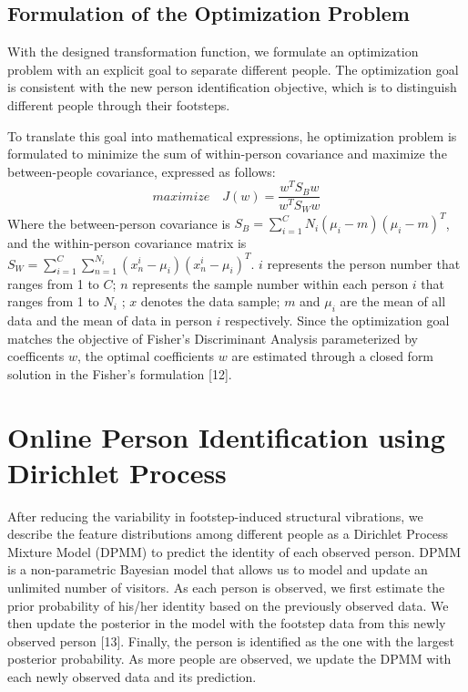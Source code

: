 \documentclass[11pt,letter]{article}
\begin{document}
\begin{multicols*}{2}
\subsection{Formulation of the Optimization Problem}
 With the designed transformation function, we formulate an optimization problem with an explicit goal to separate different people. The optimization goal is consistent with the new person identification objective, which is to distinguish different people through their footsteps. 
 
 To translate this goal into mathematical expressions, he optimization problem is formulated to minimize the sum of within-person covariance and maximize the between-people covariance, expressed as follows:
\begin{equation}
maximize \quad J(w) = \frac{w^{T}S_{B}w}{ w^{T}S_{W}w }
 \end{equation}
Where the between-person covariance is $S_B = \sum_{i=1}^{C} N_i (\mu_i - m)(\mu_i - m)^T$, and the within-person covariance matrix is ${S}_{W} = \sum_{i=1}^{C} \sum_{n=1}^{N_i} (x_n^i - \mu_i)(x_n^i - \mu_i)^T$. $i$ represents the person number that ranges from 1 to $C$; $n$ represents the sample number within each person $i$ that ranges from 1 to $N_i$ ; $x$ denotes the data sample; $m$ and $\mu_i$ are the mean of all data and the mean of data in person $i$ respectively. Since the optimization goal matches the objective of Fisher’s Discriminant Analysis parameterized by coefficents $w$, the optimal coefficients $w$ are estimated through a closed form solution in the Fisher's formulation [12]. 

\section{Online Person Identification using Dirichlet Process}
After reducing the variability in footstep-induced structural vibrations, we describe the feature distributions among different people as a Dirichlet Process Mixture Model (DPMM) to predict the identity of each observed person. DPMM is a non-parametric Bayesian model that allows us to model and update an unlimited number of visitors. As each person is observed, we first estimate the prior probability of his/her identity based on the previously observed data. We then update the posterior in the model with the footstep data from this newly observed person [13]. Finally, the person is identified as the one with the largest posterior probability. As more people are observed, we update the DPMM with each newly observed data and its prediction. 


\end{multicols*}
\end{document}
